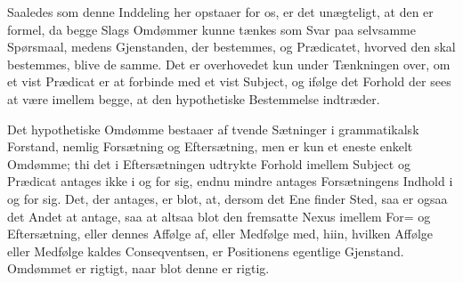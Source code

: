 \documentclass[12pt]{book}
\def\textit#1{#1}%
\def\emph#1{#1}%
\newcommand{\opage}[1]{\marginnote{\footnotesize\textit{[#1]}}}
\begin{document}
Saaledes som denne Inddeling her opstaaer for os, er det unægteligt, at den er formel, da
begge Slags Omdømmer kunne tænkes som Svar paa selvsamme Spørsmaal, medens Gjenstanden, der
bestemmes, og Prædicatet, hvorved den skal bestemmes, blive de samme. Det er overhovedet kun
under Tænkningen over, om et vist Prædicat er at forbinde med et vist Subject, og ifølge det
Forhold der sees at være imellem begge, at den hypothetiske Bestemmelse indtræder.

Det hypothetiske Omdømme bestaaer af tvende Sætninger i grammatikalsk Forstand, nemlig
\emph{Forsætning} og \emph{Eftersætning}, men er kun et eneste enkelt Omdømme; thi det i
Eftersætningen udtrykte Forhold imellem Subject og Prædicat antages ikke i og for sig, endnu
mindre antages Forsætningens Indhold i og for sig.
\opage{288} %
Det, der antages, er blot, at, dersom det Ene finder Sted, saa er ogsaa det Andet
at antage, saa at altsaa blot den fremsatte \emph{Nexus} imellem For= og
Eftersætning, eller dennes Affølge af, eller \emph{Medfølge} med, hiin, hvilken
Affølge eller Medfølge kaldes \emph{Conseqventsen}, er Positionens
egentlige Gjenstand. Omdømmet er rigtigt, naar blot denne er rigtig.
\end{document}
